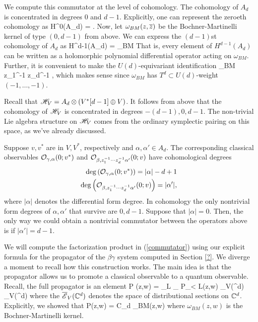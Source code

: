 \documentclass[10pt]{amsart}
\def\Bar{\overline}
\begin{document}
We compute this commutator at the level of cohomology.
The cohomology of $A_d$ is concentrated in degrees $0$ and $d-1$. 
Explicitly, one can represent the zeroeth cohomology as
\ben
H^0(A_d) = \CC[z_1,\ldots,z_d] .
\een
Now, let $\omega_{BM}(z,\zbar)$ be the Bochner-Martinelli kernel of type $(0,d-1)$ from above. 
We can express the $(d-1)$st cohomology of $A_d$ as
\ben
H^{d-1}(A_d) =  \cdot \omega_{BM} 
\een 
That is, every element of $H^{d-1}(A_d)$ can be written as a holomorphic polynomial differential operator acting on $\omega_{BM}$. 
Further, it is convenient to make the $U(d)$-equivariant identification 
\be\label{U(d) identification}
  \omega_{BM} \cong z_1^{-1} \cdots z_d^{-1} \CC[z_1^{-1}, \ldots, z_d^{-1}],
 \ee
which makes sense since $\omega_{BM}$ has $T^d \subset U(d)$-weight $(-1,\ldots,-1)$. 

Recall that $\mathscr H_V = A_d \otimes (V^*[d-1] \oplus V)$.
It follows from above that the cohomology of $\mathscr H_V$ is concentrated in degrees $-(d-1), 0, d-1$. 
The non-trivial Lie algebra structure on $\mathscr H_V$ comes from the ordinary symplectic pairing on this space, as we've already discussed. 

Suppose $v,v^*$ are in $V,V^*$, respectively and $\alpha,\alpha' \in A_d$.
The corresponding classical observables $\mathcal O_{\gamma,\alpha}(0;v^*)$ and $\mathcal O_{\beta, z_1^{-1}\cdots z_d^{-1} \alpha'}(0;v)$ have cohomological degrees
\begin{align*}
{\rm deg}\left(\mathcal O_{\gamma,\alpha}(0;v^*)\right) = |\alpha| - d + 1 \\
{\rm deg}\left(\mathcal O_{\beta, z_1^{-1}\cdots z_d^{-1} \alpha'}(0;v)\right) = |\alpha'|,
\end{align*}
where $|\alpha|$ denotes the differential form degree.
In cohomology the only nontrivial form degrees of $\alpha,\alpha'$ that survive are $0,d-1$. 
Suppose that $|\alpha| = 0$.
Then, the only way we could obtain a nontrivial commutator between the operators above is if $|\alpha'| = d-1$. 

We will compute the factorization product in (\ref{commutator}) using our explicit formula for the propagator of the $\beta\gamma$ system computed in Section \ref{?}.
We diverge a moment to recall how this construction works.
The main idea is that the propagator allows us to promote a classical observable to a quantum observable.
Recall, the full propagator is an element
\ben 
P (z,w) = \lim_{L\to \infty} \lim_{\epsilon {}} P_{\epsilon < L}(z,w) \in \Bar{\sE}_V(\CC^d) \Hat{\tensor} \Bar{\sE}_V(\CC^d)
\een
where the $\Bar{\sE}_V(\CC^d)$ denotes the space of distributional sections on $\mathbb C^d$.
Explicitly, we showed that 
\ben
P(z,w) = C_d \;\omega_{BM}(z,w) 
\een
where $\omega_{BM}(z,w)$ is the Bochner-Martinelli kernel.
\end{document}
